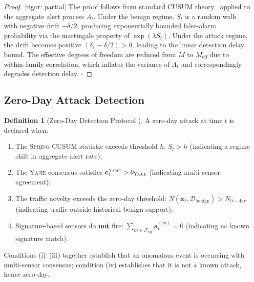 \documentclass[11pt,a4paper]{article}
\theoremstyle{definition}
\newtheorem{definition}[theorem]{Definition}
\theoremstyle{remark}
\newcommand{\rigorPartial}{\textcolor{orange!80!black}{[rigor: partial]}}
\newcommand{\Yajie}{\textsc{Yajie}}
\newcommand{\Spring}{\textsc{Spring}}
\newcommand{\cD}{\mathcal{D}}
\newcommand{\cF}{\mathcal{F}}
\newcommand{\zeroday}{\mathrm{0-day}}
\newcommand{\sensorstate}{\mathbf{x}}
\newcommand{\alertvec}{\mathbf{a}}
\begin{document}
\begin{proof}\rigorPartial
The proof follows from standard CUSUM theory~\cite{Page1954, Lorden1971} applied to the aggregate alert process $A_t$. Under the benign regime, $S_t$ is a random walk with negative drift $-\delta/2$, producing exponentially bounded false-alarm probability via the martingale property of $\exp(\lambda S_t)$. Under the attack regime, the drift becomes positive $(\delta_1 - \delta/2) > 0$, leading to the linear detection delay bound. The effective degrees of freedom are reduced from $M$ to $M_{\mathrm{eff}}$ due to within-family correlation, which inflates the variance of $A_t$ and correspondingly degrades detection delay. $\square$
\end{proof}

\subsection{Zero-Day Attack Detection}

\begin{definition}[Zero-Day Detection Protocol ]
\label{def:zeroday_protocol}
A zero-day attack at time $t$ is declared when:
\begin{enumerate}[label=(\roman*)]
    \item The \Spring{} CUSUM statistic exceeds threshold $h$: $S_t > h$ (indicating a regime shift in aggregate alert rate);
    \item The \Yajie{} consensus satisfies $\mathbf{c}_t^{\Yajie} > \theta_{\Yajie}$ (indicating multi-sensor agreement);
    \item The traffic novelty exceeds the zero-day threshold: $N(\sensorstate_t, \cD_{\mathrm{benign}}) > N_{\zeroday}$ (indicating traffic outside historical benign support);
    \item Signature-based sensors do \textbf{not} fire: $\sum_{m \in \cF_{\mathrm{sig}}} \alertvec_t^{(m)} = 0$ (indicating no known signature match).
\end{enumerate}
Conditions (i)--(iii) together establish that an anomalous event is occurring with multi-sensor consensus; condition (iv) establishes that it is not a known attack, hence zero-day.
\end{definition}
\end{document}
